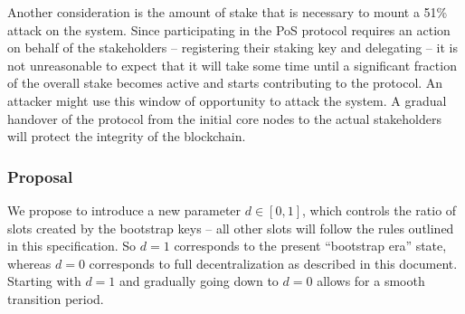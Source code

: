 \documentclass[11pt,a4paper,dvipsnames,twosided]{article}
\begin{document}
Another consideration is the amount of stake that is necessary to mount
a 51\% attack on the system. Since participating in the PoS protocol
requires an action on behalf of the stakeholders -- registering their
staking key and delegating -- it is not unreasonable to expect that it
will take some time until a significant fraction of the overall stake
becomes active and starts contributing to the protocol. An attacker
might use this window of opportunity to attack the system. A gradual
handover of the protocol from the initial core nodes to the actual
stakeholders will protect the integrity of the blockchain.

\subsubsection{Proposal}
\label{proposal}

We propose to introduce a new parameter \(d\in[0,1]\), which controls
the ratio of slots created by the bootstrap keys -- all other slots will
follow the rules outlined in this specification. So \(d=1\) corresponds
to the present ``bootstrap era'' state, whereas \(d=0\) corresponds to
full decentralization as described in this document. Starting with
\(d=1\) and gradually going down to \(d=0\) allows for a smooth
transition period.
\end{document}

